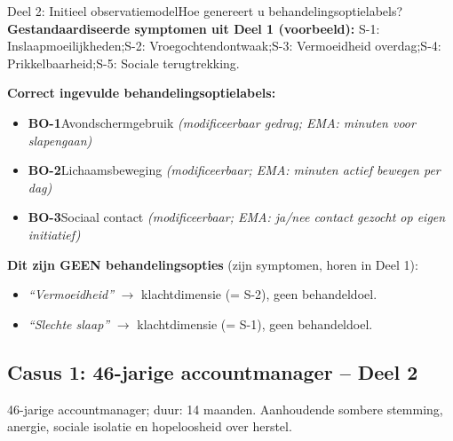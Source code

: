\documentclass[11pt,a4paper]{article}
\begin{document}
\vspace{0.5em}
\nopagebreak[4]

\begin{voorbeeldbox}{Deel 2: Initieel observatiemodel}{Hoe genereert u behandelingsoptielabels?}
\small
\textbf{Gestandaardiseerde symptomen uit Deel 1 (voorbeeld):}
S-1: Inslaapmoeilijkheden;\enspace S-2: Vroegochtendontwaak;\enspace S-3: Vermoeidheid overdag;\enspace S-4: Prikkelbaarheid;\enspace S-5: Sociale terugtrekking.

\medskip
\textbf{Correct ingevulde behandelingsoptielabels:}
\begin{itemize}[topsep=2pt,itemsep=1pt]
\item \textbf{BO-1}\enspace Avondschermgebruik
  \hfill\textit{(modificeerbaar gedrag; EMA: minuten voor slapengaan)}
\item \textbf{BO-2}\enspace Lichaamsbeweging
  \hfill\textit{(modificeerbaar; EMA: minuten actief bewegen per dag)}
\item \textbf{BO-3}\enspace Sociaal contact
  \hfill\textit{(modificeerbaar; EMA: ja/nee contact gezocht op eigen initiatief)}
\end{itemize}

\medskip
\textbf{\color{StrongRed}Dit zijn GEEN behandelingsopties} (zijn symptomen, horen in Deel 1):
\begin{itemize}[topsep=1pt,itemsep=0pt]
\item \textit{``Vermoeidheid''} $\rightarrow$ klachtdimensie (= S-2), geen behandeldoel.
\item \textit{``Slechte slaap''} $\rightarrow$ klachtdimensie (= S-1), geen behandeldoel.
\end{itemize}
\end{voorbeeldbox}

\vspace{0.5em}

\newpage
\subsection*{Casus 1: 46-jarige accountmanager -- Deel 2}

\begin{complaintbox}[title={Casus 1: verkorte klachtomschrijving}]
\small 46-jarige accountmanager; duur: 14 maanden. Aanhoudende sombere stemming, anergie, sociale isolatie en hopeloosheid over herstel.
\end{complaintbox}
\end{document}
